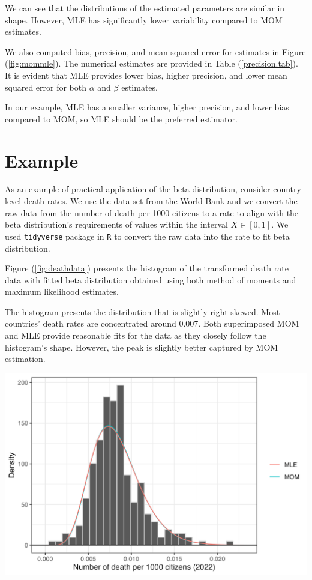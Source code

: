 \documentclass{article}\usepackage[]{graphicx}\usepackage[]{xcolor}
\newenvironment{Figure}
  {\par\medskip\noindent\minipage{\linewidth}}
  {\endminipage\par\medskip}
\begin{document}
\begin{multicols}{2}
We can see that the distributions of the estimated parameters are similar in shape. However, MLE has significantly lower variability compared to MOM estimates.

We also computed bias, precision, and mean squared error for estimates in Figure (\ref{fig:mommle}). The numerical estimates are provided in Table (\ref{precision.tab}). It is evident that MLE provides lower bias, higher precision, and lower mean squared error for both $\alpha$ and $\beta$ estimates.

In our example, MLE has a smaller variance, higher precision, and lower bias compared to MOM, so MLE should be the preferred estimator.


\section{Example}\label{sec:examp}
As an example of practical application of the beta distribution, consider country-level death rates. We use the data set from the World Bank and we convert the raw data from the number of death per 1000 citizens to a rate to align with the beta distribution's requirements of values within the interval $X \in [0,1]$. We used \texttt{tidyverse} package in \texttt{R} \citep{tidyverse} to convert the raw data into the rate to fit beta distribution.

Figure (\ref{fig:deathdata}) presents the histogram of the transformed death rate data with fitted beta distribution obtained using both method of moments and maximum likelihood estimates. 

The histogram presents the distribution that is slightly right-skewed. Most countries' death rates are concentrated around 0.007. Both superimposed MOM and MLE provide reasonable fits for the data as they closely follow the histogram's shape. However, the peak is slightly better captured by MOM estimation.

\begin{Figure}
 \centering
 \includegraphics[width=\linewidth]{deathdata.png}
 \label{fig:deathdata}
\end{Figure}


\end{multicols}
\end{document}
